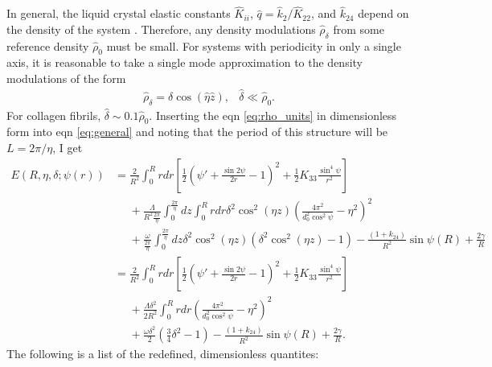 \documentclass[12pt]{article}
\begin{document}
In general, the liquid crystal elastic constants $\hat{K}_{ii}$, $\hat{q}=\hat{k}_{2}/\hat{K}_{22}$, and $\hat{k}_{24}$ depend on the density of the system \cite{Odijk:liqcryst1986}. Therefore, any density modulations $\hat{\rho}_{\delta}$ from some reference density $\hat{\rho}_0$ must be small. For systems with periodicity in only a single axis, it is reasonable to take a single mode approximation to the density modulations of the form
\begin{equation}\label{eq:rho_units}
\begin{array}{lr}
	\hat{\rho}_{\delta}=\delta\cos(\hat{\eta}\hat{z}), &\hat{\delta}\ll\hat{\rho}_0.
\end{array}
\end{equation}
For collagen fibrils, $\hat{\delta}\sim0.1\hat{\rho}_0$. Inserting the eqn \ref{eq:rho_units} in dimensionless form into eqn \ref{eq:general} and noting that the period of this structure will be $L=2\pi/\eta$, I get
\begin{align}\label{eq:final}
E(R,\eta,\delta;\psi(r))&=\frac{2}{R^2}\int_0^{R}rdr\left[\frac{1}{2}\left(\psi'+\frac{\sin2\psi}{2r}-1\right)^2+\frac{1}{2}K_{33}\frac{\sin^4\psi}{r^2}\right]\nonumber\\
&\phantom{=}+\frac{\Lambda}{R^2{\frac{2\pi}{\eta}}}\int_0^{{\frac{2\pi}{\eta}}}dz\int_0^{R}rdr\delta^2\cos^2(\eta z)\left(\frac{4\pi^2}{d_0^2\cos^2\psi}-\eta^2\right)^2\nonumber\\
&\phantom{=}+\frac{\omega}{{\frac{2\pi}{\eta}}}\int_0^{{\frac{2\pi}{\eta}}}dz\delta^2\cos^2(\eta z)\left(\delta^2\cos^2(\eta z)-1\right)-\frac{(1+k_{24})}{R^2}\sin\psi(R)+\frac{2\gamma}{R}\nonumber\\
&=\frac{2}{R^2}\int_0^{R}rdr\left[\frac{1}{2}\left(\psi'+\frac{\sin2\psi}{2r}-1\right)^2+\frac{1}{2}K_{33}\frac{\sin^4\psi}{r^2}\right]\nonumber\\
&\phantom{=}+\frac{\Lambda\delta^2}{2R^2}\int_0^{R}rdr\left(\frac{4\pi^2}{d_0^2\cos^2\psi}-\eta^2\right)^2\nonumber\\
&\phantom{=}+\frac{\omega\delta^2}{2}\left(\frac{3}{4}\delta^2-1\right)-\frac{(1+k_{24})}{R^2}\sin\psi(R)+\frac{2\gamma}{R}.
\end{align}
The following is a list of the redefined, dimensionless quantites:
\end{document}
